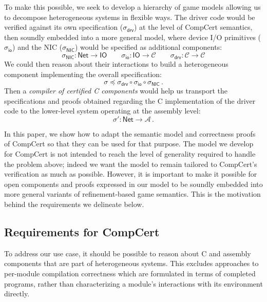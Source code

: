 \documentclass[acmsmall,authordraft]{acmart}
\newcommand{\kw}[1]{\ensuremath{ \mathsf{#1} }}
\newcommand{\refby}{\preceq}
\begin{document}
To make this possible, we seek to develop a hierarchy of game models
allowing us to decompose heterogeneous systems in flexible ways.
The driver code would be verified against its own specification
($\sigma_\kw{drv}$)
at the level of CompCert semantics,
then soundly embedded into a more general model,
where device I/O primitives
($\sigma_\kw{io}$)
and the NIC
($\sigma_\kw{NIC}$)
would be specified as additional components:
\[
  \sigma_\kw{NIC} : \kw{Net} \rightarrow \kw{IO}
  \qquad
  \sigma_\kw{io} : \kw{IO} \rightarrow \mathcal{C}
  \qquad
  \sigma_\kw{drv} : \mathcal{C} \rightarrow \mathcal{C}
\]
We could then reason about their interactions
to build a heterogeneous component implementing
the overall specification:
\[
  \sigma \refby
  \sigma_\kw{drv} \circ \sigma_\kw{io} \circ \sigma_\kw{NIC} \,.
\]
Then a \emph{compiler of certified C components}
would help us transport the specifications and proofs
obtained regarding the C implementation of the driver code
to the lower-level system operating at the assembly level:
\[
  \sigma' : \kw{Net} \rightarrow \mathcal{A} \,.
\]

In this paper, we show how to adapt
the semantic model and correctness proofs of CompCert
so that they can be used for that purpose.
The model we develop for CompCert
is not intended to reach the level of generality
required to handle the problem above;
indeed we want the model to remain tailored to CompCert's
verification as much as possible.
However, it is important to make it
possible for open components and proofs expressed in our model to be
soundly embedded into more general variants of refinement-based game
semantics. This is the motivation behind the requirements we
delineate below.

\subsection{Requirements for CompCert}

To address our use case,
it should be possible to reason about
C and assembly components that are part of
heterogeneous systems.
This excludes approaches to
per-module compilation correctness which are formulated in terms
of completed programs,
rather than characterizing a module's interactions
with its environment directly.
\end{document}
